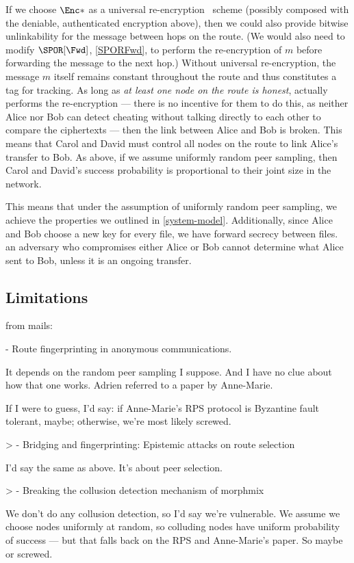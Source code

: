 If we choose \(\Enc*\) as a universal re-encryption~\cite{UniversalReencryption} 
scheme (possibly composed with the deniable, authenticated encryption above), 
then we could also provide bitwise unlinkability for the message between hops on 
the route.
(We would also need to modify \(\SPOR[\Fwd]\), \cref{SPORFwd}, to perform the 
re-encryption of \(m\) before forwarding the message to the next hop.)
Without universal re-encryption, the message \(m\) itself remains constant 
throughout the route and thus constitutes a tag for tracking.
As long as \emph{at least one node on the route is honest}, \ie actually 
performs the re-encryption --- there is no incentive for them to do this, as 
neither Alice nor Bob can detect cheating without talking directly to each other 
to compare the ciphertexts --- then the link between Alice and Bob is broken.
This means that Carol and David must control all nodes on the route to link 
Alice's transfer to Bob.
As above, if we assume uniformly random peer sampling, then Carol and David's 
success probability is proportional to their joint size in the network.

This means that under the assumption of uniformly random peer sampling, we 
achieve the properties we outlined in \cref{system-model}.
Additionally, since Alice and Bob choose a new key for every file, we have 
forward secrecy between files.
\Eg an adversary who compromises either Alice or Bob cannot determine what Alice 
sent to Bob, unless it is an ongoing transfer.

\subsection{Limitations}%
\label{security-limitations}
from mails:

- Route fingerprinting in anonymous communications.

It depends on the random peer sampling I suppose. And I have no clue 
about how that one works. Adrien referred to a paper by Anne-Marie.

If I were to guess, I'd say: if Anne-Marie's RPS protocol is Byzantine 
fault tolerant, maybe; otherwise, we're most likely screwed.

> - Bridging and fingerprinting: Epistemic attacks on route selection

I'd say the same as above. It's about peer selection.

> - Breaking the collusion detection mechanism of morphmix

We don't do any collusion detection, so I'd say we're vulnerable. We 
assume we choose nodes uniformly at random, so colluding nodes have 
uniform probability of success --- but that falls back on the RPS and 
Anne-Marie's paper. So maybe or screwed.

